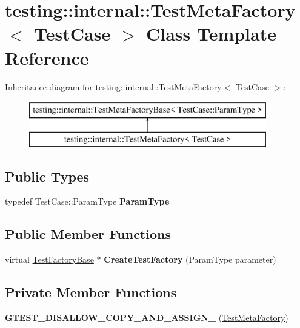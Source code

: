 \hypertarget{classtesting_1_1internal_1_1_test_meta_factory}{}\section{testing\+:\+:internal\+:\+:Test\+Meta\+Factory$<$ Test\+Case $>$ Class Template Reference}
\label{classtesting_1_1internal_1_1_test_meta_factory}
Inheritance diagram for testing\+:\+:internal\+:\+:Test\+Meta\+Factory$<$ Test\+Case $>$\+:\begin{figure}[H]
\begin{center}
\leavevmode
\includegraphics[height=2.000000cm]{classtesting_1_1internal_1_1_test_meta_factory}
\end{center}
\end{figure}
\subsection*{Public Types}
\begin{DoxyCompactItemize}
\item 
\mbox{\label{classtesting_1_1internal_1_1_test_meta_factory_a9c12e442b4389381b948ed669fcf0f84}} 
typedef Test\+Case\+::\+Param\+Type {\bfseries Param\+Type}
\end{DoxyCompactItemize}
\subsection*{Public Member Functions}
\begin{DoxyCompactItemize}
\item 
\mbox{\label{classtesting_1_1internal_1_1_test_meta_factory_ae9f5334c68af309bca8f7ec29d837e38}} 
virtual \mbox{\hyperlink{classtesting_1_1internal_1_1_test_factory_base}{Test\+Factory\+Base}} $\ast$ {\bfseries Create\+Test\+Factory} (Param\+Type parameter)
\end{DoxyCompactItemize}
\subsection*{Private Member Functions}
\begin{DoxyCompactItemize}
\item 
\mbox{\label{classtesting_1_1internal_1_1_test_meta_factory_a06dd1b73a2bb043937401fceea86c1e8}} 
{\bfseries G\+T\+E\+S\+T\+\_\+\+D\+I\+S\+A\+L\+L\+O\+W\+\_\+\+C\+O\+P\+Y\+\_\+\+A\+N\+D\+\_\+\+A\+S\+S\+I\+G\+N\+\_\+} (\mbox{\hyperlink{classtesting_1_1internal_1_1_test_meta_factory}{Test\+Meta\+Factory}})
\end{DoxyCompactItemize}


